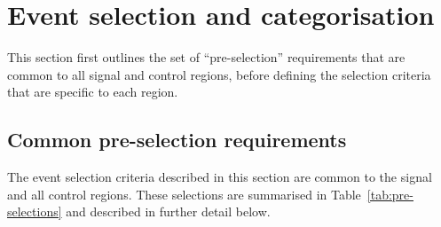 \section{Event selection and categorisation}
\label{sec:selection}

This section first outlines the set of ``pre-selection'' requirements
that are common to all signal and control regions, before defining the
selection criteria that are specific to each region.

\subsection{Common pre-selection requirements}
\label{sec:preSelection}

The event selection criteria described in this section are common to
the signal and all control regions. These selections are summarised in
Table~\ref{tab:pre-selections} and described in further detail below. 


